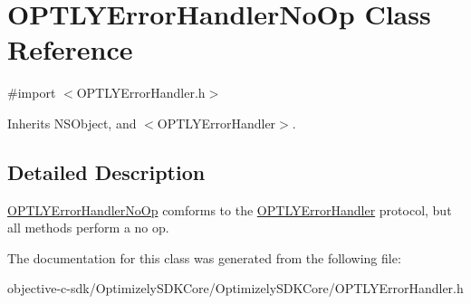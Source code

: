 \hypertarget{interface_o_p_t_l_y_error_handler_no_op}{}\section{O\+P\+T\+L\+Y\+Error\+Handler\+No\+Op Class Reference}
\label{interface_o_p_t_l_y_error_handler_no_op}


{\ttfamily \#import $<$O\+P\+T\+L\+Y\+Error\+Handler.\+h$>$}



Inherits N\+S\+Object, and $<$\+O\+P\+T\+L\+Y\+Error\+Handler$>$.



\subsection{Detailed Description}
\mbox{\hyperlink{interface_o_p_t_l_y_error_handler_no_op}{O\+P\+T\+L\+Y\+Error\+Handler\+No\+Op}} comforms to the \mbox{\hyperlink{class_o_p_t_l_y_error_handler-p}{O\+P\+T\+L\+Y\+Error\+Handler}} protocol, but all methods perform a no op. 

The documentation for this class was generated from the following file\+:\begin{DoxyCompactItemize}
\item 
objective-\/c-\/sdk/\+Optimizely\+S\+D\+K\+Core/\+Optimizely\+S\+D\+K\+Core/O\+P\+T\+L\+Y\+Error\+Handler.\+h\end{DoxyCompactItemize}
